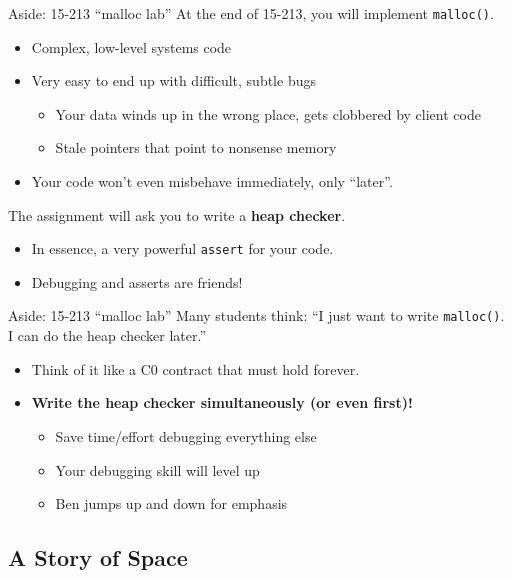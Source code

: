 \documentclass[xcolor=dvipsnames]{beamer}
\begin{document}
\begin{frame}{Aside: 15-213 ``malloc lab''}
	At the end of 15-213, you will implement \texttt{malloc()}.
	\begin{itemize}
		\item Complex, low-level systems code
		\item Very easy to end up with difficult, subtle bugs
		\begin{itemize}
			\item Your data winds up in the wrong place, gets clobbered by client code
			\item Stale pointers that point to nonsense memory
		\end{itemize}
		\item Your code won't even misbehave immediately, only ``later''.
	\end{itemize}
	\pause
	\linegap

	The assignment will ask you to write a {\bf heap checker}.
	\begin{itemize}
		\item In essence, a very powerful \texttt{assert} for your code.
		\item Debugging and asserts are friends!
	\end{itemize}
\end{frame}

\begin{frame}{Aside: 15-213 ``malloc lab''}
	Many students think: ``I just want to write \texttt{malloc()}. I can do the heap checker later.''
	\pause
	\begin{itemize}
		\item Think of it like a C0 contract that must hold forever.
		\item \textbf{Write the heap checker simultaneously (or even first)!}
			\pause
			\begin{itemize}
				\item Save time/effort debugging everything else
				\item Your debugging skill will level up
				\item Ben jumps up and down for emphasis
			\end{itemize}
	\end{itemize}
\end{frame}

\subsection{A Story of Space}
\end{document}
